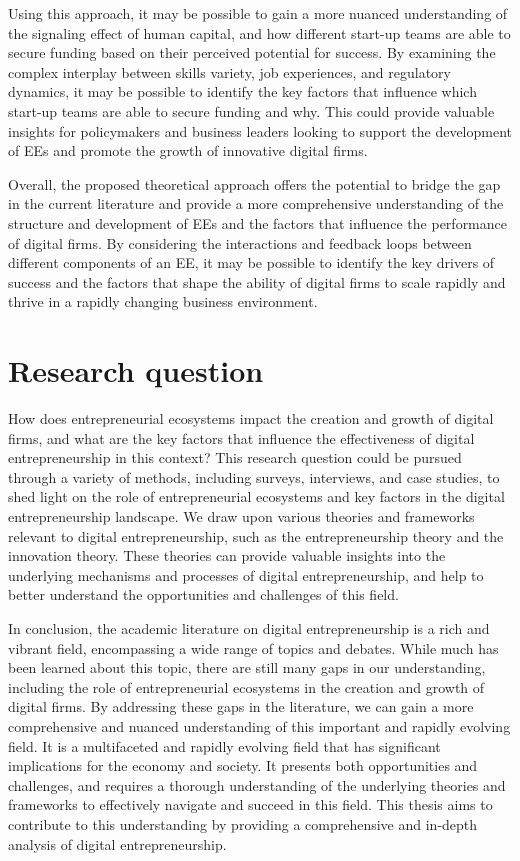\documentclass[12pt]{article}
\begin{document}
Using this approach, it may be possible to gain a more nuanced understanding of the signaling effect of human capital, and how different start-up teams are able to secure funding based on their perceived potential for success. By examining the complex interplay between skills variety, job experiences, and regulatory dynamics, it may be possible to identify the key factors that influence which start-up teams are able to secure funding and why. This could provide valuable insights for policymakers and business leaders looking to support the development of EEs and promote the growth of innovative digital firms.

Overall, the proposed theoretical approach offers the potential to bridge the gap in the current literature and provide a more comprehensive understanding of the structure and development of EEs and the factors that influence the performance of digital firms. By considering the interactions and feedback loops between different components of an EE, it may be possible to identify the key drivers of success and the factors that shape the ability of digital firms to scale rapidly and thrive in a rapidly changing business environment.



\section{Research question}

How does entrepreneurial ecosystems impact the creation and growth of digital firms, and what are the key factors that influence the effectiveness of digital entrepreneurship in this context? This research question could be pursued through a variety of methods, including surveys, interviews, and case studies, to shed light on the role of entrepreneurial ecosystems and key factors in the digital entrepreneurship landscape. We draw upon various theories and frameworks relevant to digital entrepreneurship, such as the entrepreneurship theory and the innovation theory. These theories can provide valuable insights into the underlying mechanisms and processes of digital entrepreneurship, and help to better understand the opportunities and challenges of this field.

In conclusion, the academic literature on digital entrepreneurship is a rich and vibrant field, encompassing a wide range of topics and debates. While much has been learned about this topic, there are still many gaps in our understanding, including the role of entrepreneurial ecosystems in the creation and growth of digital firms. By addressing these gaps in the literature, we can gain a more comprehensive and nuanced understanding of this important and rapidly evolving field. It is a multifaceted and rapidly evolving field that has significant implications for the economy and society. It presents both opportunities and challenges, and requires a thorough understanding of the underlying theories and frameworks to effectively navigate and succeed in this field. This thesis aims to contribute to this understanding by providing a comprehensive and in-depth analysis of digital entrepreneurship.
\end{document}
